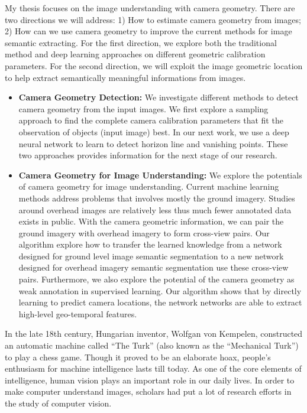 My thesis focuses on the image understanding with camera geometry.
There are two directions we will address: 1) How to estimate camera
geometry from images; 2) How can we use camera geometry to improve the
current methods for image semantic extracting. For the first direction,
we explore both the traditional method and deep learning approaches on
different geometric calibration parameters. For the second direction,
we will exploit the image geometric location to help extract
semantically meaningful informations from images.

\begin{itemize}[noitemsep]

  \item \textbf{Camera Geometry Detection:} 
  We investigate different methods to detect camera geometry from the
  input images. We first explore a sampling approach to find the
  complete camera calibration parameters that fit the observation of
  objects (input image) best. In our next work, we use a deep neural
  network to learn to detect horizon line and vanishing points. These
  two approaches provides information for the next stage of our
  research.

  \item \textbf{Camera Geometry for Image Understanding:}
  We explore the potentials of camera geometry for image understanding.
  Current machine learning methods address problems that involves mostly
  the ground imagery. 
  Studies around overhead images are relatively less thus much fewer
  annotated data exists in public. With the camera geometric
  information, we can pair the ground imagery with overhead imagery to
  form cross-view pairs. Our algorithm explore how to transfer the
  learned knowledge from a network designed for ground level image
  semantic segmentation to a new network designed for overhead imagery
  semantic segmentation use these cross-view pairs.
  Furthermore, we also explore the potential of the camera geometry as
  weak annotation in supervised learning. Our algorithm shows that by
  directly learning to predict camera locations, the network networks
  are able to extract high-level geo-temporal features.
\end{itemize}


In the late 18th century, Hungarian inventor, Wolfgan von
Kempelen, constructed an automatic machine called ``The Turk'' (also
known as the ``Mechanical Turk'') to play a chess game. Though it
proved to be an elaborate hoax, people's enthusiasm for machine
intelligence lasts till today. As one of the core elements of
intelligence, human vision plays an important role in our daily lives.
In order to make computer understand images, scholars had put a lot of
research efforts in the study of computer vision. 


